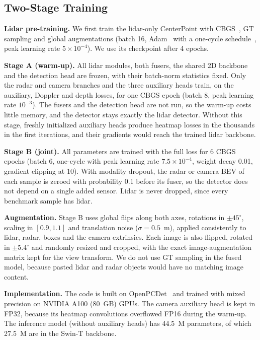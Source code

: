 \documentclass[conference]{IEEEtran}
\begin{document}
\subsection{Two-Stage Training}

\textbf{Lidar pre-training.} We first train the lidar-only CenterPoint with CBGS~\cite{zhu2019cbgs}, GT sampling and
global augmentations (batch 16, Adam~\cite{kingma2015adam} with a one-cycle schedule~\cite{smith2019superconvergence},
peak learning rate $5 \times 10^{-4}$). We use its checkpoint after 4 epochs.

\textbf{Stage A (warm-up).} All lidar modules, both fusers, the shared 2D backbone and the detection head are frozen,
with their batch-norm statistics fixed. Only the radar and camera branches and the three auxiliary heads train, on
the auxiliary, Doppler and depth losses, for one CBGS epoch (batch 8, peak learning rate $10^{-3}$). The fusers and the
detection head are not run, so the warm-up costs little memory, and the detector stays exactly the lidar detector.
Without this stage, freshly initialized auxiliary heads produce heatmap losses in the thousands in the first
iterations, and their gradients would reach the trained lidar backbone.

\textbf{Stage B (joint).} All parameters are trained with the full loss for 6 CBGS epochs (batch 6, one-cycle with
peak learning rate $7.5 \times 10^{-4}$, weight decay 0.01, gradient clipping at 10). With modality dropout, the radar
or camera BEV of each sample is zeroed with probability 0.1 before its fuser, so the detector does not depend on a
single added sensor. Lidar is never dropped, since every benchmark sample has lidar.

\textbf{Augmentation.} Stage B uses global flips along both axes, rotations in $\pm 45^\circ$, scaling in
$[0.9, 1.1]$ and translation noise ($\sigma = 0.5$~m), applied consistently to lidar, radar, boxes and the camera
extrinsics. Each image is also flipped, rotated in $\pm 5.4^\circ$ and randomly resized and cropped, with the exact
image-augmentation matrix kept for the view transform. We do not use GT sampling in the fused model, because pasted
lidar and radar objects would have no matching image content.

\textbf{Implementation.} The code is built on OpenPCDet~\cite{openpcdet2020} and trained with mixed precision on
NVIDIA A100 (80~GB) GPUs. The camera auxiliary head is kept in FP32, because its heatmap convolutions overflowed FP16
during the warm-up. The inference model (without auxiliary heads) has 44.5~M parameters, of which 27.5~M are in the
Swin-T backbone.
\end{document}
